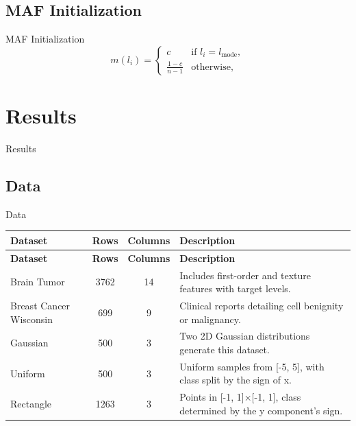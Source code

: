 \documentclass[aspectratio=169]{beamer}
\begin{document}
\subsection{MAF Initialization}
\begin{frame}{MAF Initialization}
\[
m(l_i) = 
\begin{cases} 
c & \text{if } l_i = l_{\text{mode}}, \\
\frac{1-c}{n-1} & \text{otherwise},
\end{cases}
\]
\end{frame}

\section{Results}

\begin{frame}
    \begin{center}
        \Huge Results
    \end{center}
\end{frame}

\subsection{Data}
\begin{frame}{Data}
{\rm
\begin{longtable}{|>{\raggedright\arraybackslash}p{3cm}|c|c|>{\raggedright\arraybackslash}p{5cm}|}
\hline
\textbf{Dataset} & \textbf{Rows} & \textbf{Columns} & \textbf{Description} \\ \hline
\endfirsthead
\hline
\textbf{Dataset} & \textbf{Rows} & \textbf{Columns} & \textbf{Description} \\ \hline
\endhead
Brain Tumor & 3762 & 14 & Includes first-order and texture features with target levels. \\ \hline
Breast Cancer Wisconsin & 699 & 9 & Clinical reports detailing cell benignity or malignancy. \\ \hline
Gaussian & 500 & 3 & Two 2D Gaussian distributions generate this dataset. \\ \hline
Uniform & 500 & 3 & Uniform samples from [-5, 5], with class split by the sign of x. \\ \hline
Rectangle & 1263 & 3 & Points in [-1, 1]×[-1, 1], class determined by the y component's sign. \\ \hline
\end{longtable}
}
\end{frame}
\end{document}
